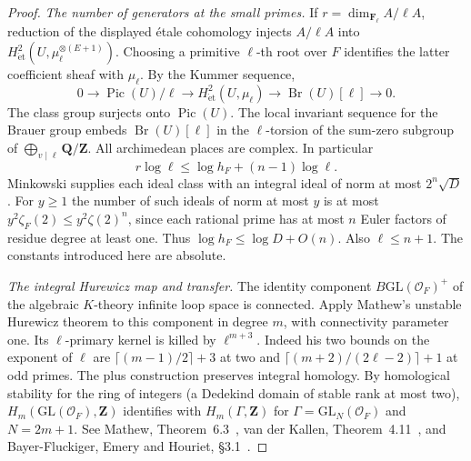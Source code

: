 \begin{proof}
\emph{The number of generators at the small primes.}
If \(r=\dim_{\mathbf F_\ell}A/\ell A\), reduction of the displayed
\'etale cohomology injects \(A/\ell A\) into
\(H^2_{\mathrm{\acute et}}(U,\mu_\ell^{\otimes(E+1)})\).
Choosing a primitive \(\ell\)-th root over \(F\) identifies the latter
coefficient sheaf with \(\mu_\ell\). By the Kummer sequence,
\[
 0\longrightarrow\operatorname{Pic}(U)/\ell
 \longrightarrow H^2_{\mathrm{\acute et}}(U,\mu_\ell)
 \longrightarrow\operatorname{Br}(U)[\ell]\longrightarrow0 .
\]
The class group surjects onto \(\operatorname{Pic}(U)\). The local
invariant sequence for the Brauer group embeds
\(\operatorname{Br}(U)[\ell]\) in the \(\ell\)-torsion of the
sum-zero subgroup of \(\bigoplus_{v\mid\ell}\mathbf Q/\mathbf Z\).
All archimedean places are complex. In particular
\[
 r\log\ell\le\log h_F+(n-1)\log\ell .                 \tag{*}
\]
Minkowski supplies each ideal class with an integral ideal of norm at
most \(2^n\sqrt D\). For \(y\ge1\) the number of such ideals of norm
at most \(y\) is at most \(y^2\zeta_F(2)\le y^2\zeta(2)^n\), since
each rational prime has at most \(n\) Euler factors of residue degree
at least one. Thus \(\log h_F\le\log D+O(n)\). Also
\(\ell\le n+1\). The constants introduced here are absolute.

\emph{The integral Hurewicz map and transfer.}
The identity component \(B\mathrm{GL}(\mathcal O_F)^+\) of the
algebraic \(K\)-theory infinite loop space is connected. Apply Mathew's
unstable Hurewicz theorem to this component in degree \(m\), with
connectivity parameter one. Its \(\ell\)-primary kernel is killed by
\(\ell^{m+3}\). Indeed his two bounds on the exponent of \(\ell\) are
\(\lceil(m-1)/2\rceil+3\) at two and
\(\lceil(m+2)/(2\ell-2)\rceil+1\) at odd primes. The plus
construction preserves integral homology. By homological stability
for the ring of integers (a Dedekind domain of stable rank at most
two), \(H_m(\mathrm{GL}(\mathcal O_F),\mathbf Z)\) identifies with
\(H_m(\Gamma,\mathbf Z)\) for
\(\Gamma=\mathrm{GL}_N(\mathcal O_F)\) and \(N=2m+1\).
See Mathew, Theorem~6.3~\cite{mathewHurewicz}, van der Kallen,
Theorem~4.11~\cite{vanderKallen}, and Bayer-Fluckiger, Emery and
Houriet, \S3.1~\cite{bayerEmeryHouriet}.


\end{proof}
